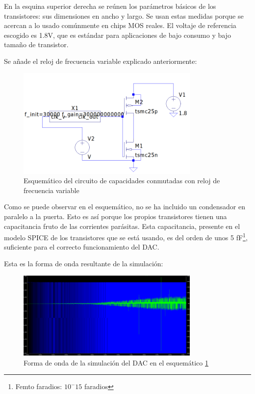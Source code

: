 \documentclass[12pt]{report} %
\begin{document}
	En la esquina superior derecha se reúnen los parámetros básicos de los transistores: sus dimensiones en ancho y largo. Se usan estas medidas porque se acercan a lo usado comúnmente en chips MOS reales. 
	El voltaje de referencia escogido es 1.8V, que es estándar para aplicaciones de bajo consumo y bajo tamaño de transistor.
	
	Se añade el reloj de frecuencia variable explicado anteriormente:

	\begin{figure}[H]
		\includegraphics[width=0.8\textwidth]{ltspice-sw-with-clk-freq.png}
		\caption[Esquemático del circuito de capacidades conmutadas con reloj de frecuencia variable]{Esquemático del circuito de capacidades conmutadas con reloj de frecuencia variable}
		\label{fig:ltspice-sw-with-clk-freq.png}
	\end{figure}

	Como se puede observar en el esquemático, no se ha incluido un condensador en paralelo a la puerta. Esto es así porque los propios transistores tienen una capacitancia fruto de las corrientes parásitas. Esta capacitancia, presente en el modelo SPICE de los transistores que se está usando, es del orden de unos 5 fF\footnote{Femto faradios: $10^-15$ faradios}, suficiente para el correcto funcionamiento del DAC.

	Esta es la forma de onda resultante de la simulación:
	
	\begin{figure}[H]
		\includegraphics[width=0.8\textwidth]{dac-sim-waveform.png}
		\caption[Forma de onda de la simulación del DAC en el esquemático \ref{fig:ltspice-sw-with-clk-freq.png}]{Forma de onda de la simulación del DAC en el esquemático \ref{fig:ltspice-sw-with-clk-freq.png}}
		\label{fig:dac-graph-waveform.png}
	\end{figure}
\end{document}
